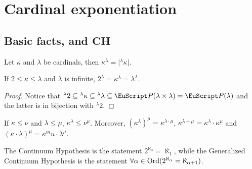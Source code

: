 \documentclass[twoside,openright,titlepage,numbers=noenddot,%
               headinclude,footinclude,cleardoublepage=empty,abstract=on,
               BCOR=23mm,paper=letter,fontsize=11pt
               ]{scrreprt}
\begin{document}
\section{Cardinal exponentiation}
\subsection{Basic facts, and CH}
\begin{definition}
    Let $\kappa$ and $\lambda$ be cardinals, then $\kappa^\lambda = \vert {}^{\lambda} \kappa \vert$.
\end{definition}
\begin{proposition}
    If $2 \leq \kappa \leq \lambda$ and $\lambda$ is infinite, $2^\lambda = \kappa^\lambda = \lambda^\lambda$.
\end{proposition}
\begin{proof}
    Notice that ${}^{\lambda}2 \subseteq {}^{\lambda}\kappa \subseteq {}^{\lambda}\lambda \subseteq \P(\lambda \times \lambda) = \P(\lambda)$ and the latter is in bijection with ${}^{\lambda}2$.
\end{proof}
\begin{lemma}
If $\kappa \leq \nu$ and $\lambda \leq \mu$, $\kappa^\lambda \leq \nu^\mu$. Moreover, $(\kappa^\lambda)^\mu = \kappa^{\lambda \cdot \mu}$, $\kappa^{\lambda+\mu} = \kappa^\lambda \cdot \kappa^\mu$ and $(\kappa \cdot \lambda)^\mu = \kappa^mu \cdot \lambda^\mu$.
\end{lemma}
The Continuum Hypothesis is the statement $2^{\aleph_0} = \aleph_1$, while the Generalized Continuum Hypothesis is the statement $\forall \alpha \in \mathrm{Ord} (2^{\aleph_\alpha} = \aleph_{\alpha+1})$.
\end{document}

